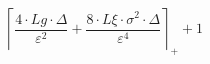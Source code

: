 \[\left\lceil \frac{4 \cdot Lg \cdot \Delta}{\varepsilon^{2}} + \frac{8 \cdot L\xi \cdot \sigma^{2} \cdot \Delta}{\varepsilon^{4}} \right\rceil_{+} + 1\]
